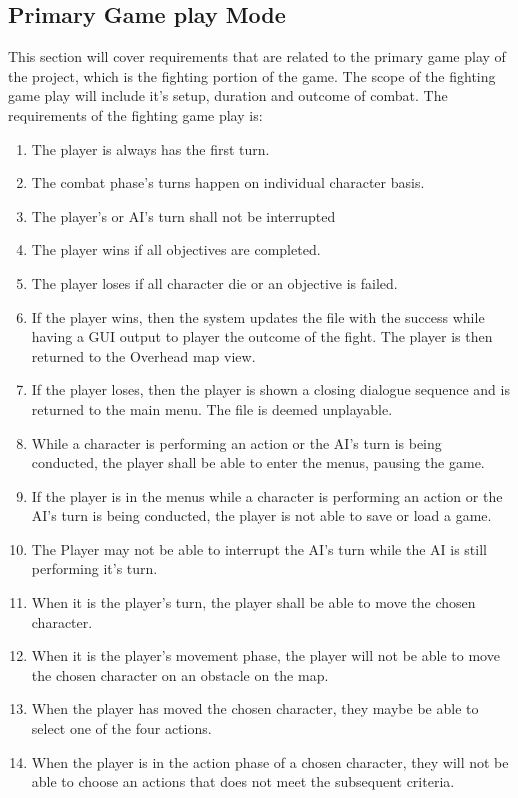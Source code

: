 \documentclass{article}
\begin{document}
\subsection{Primary Game play Mode}
\quad This section will cover requirements that are related to the primary game play of the project, which is the fighting portion of the game. The scope of the fighting game play will include it's setup, duration and outcome of combat. The requirements of the fighting game play is:
\begin{enumerate}[{PGR}1. ]
	\item The player is always has the first turn.
	\item The combat phase's turns happen on individual character basis.
	\item The player's or AI's turn shall not be interrupted
	\item The player wins if all objectives are completed.
	\item The player loses if all character die or an objective is failed.
	\item If the player wins, then the system updates the file with the success while having a GUI output to player the outcome of the fight. The player is then returned to the Overhead map view.
	\item If the player loses, then the player is shown a closing dialogue sequence and is returned to the main menu. The file is deemed unplayable.
	\item While a character is performing an action or the AI's turn is being conducted, the player shall be able to enter the menus, pausing the game.
	\item If the player is in the menus while a character is performing an action or the AI's turn is being conducted, the player is not able to save or load a game.
	\item The Player may not be able to interrupt the AI's turn while the AI is still performing it's turn.
	\item When it is the player's turn, the player shall be able to move the chosen character.
	\item When it is the player's movement phase, the player will not be able to move the chosen character on an obstacle on the map.
	\item When the player has moved the chosen character, they maybe be able to select one of the four actions.
	\item When the player is in the action phase of a chosen character, they will not be able to choose an actions that does not meet the subsequent criteria.

\end{enumerate}
\end{document}

